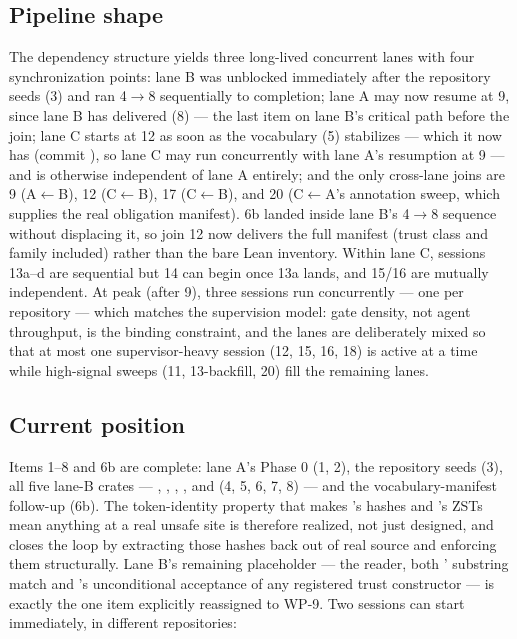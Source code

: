 \subsection{Pipeline shape}

The dependency structure yields three long-lived concurrent lanes with
four synchronization points: lane B was unblocked immediately after the
repository seeds (3) and ran 4$\to$8 sequentially to completion; lane A
may now resume at 9, since lane B has delivered  (8) ---
the last item on lane B's critical path before the join; lane C starts at 12 as soon as the vocabulary
(5) stabilizes --- which it now has (commit ), so lane C
may run concurrently with lane A's resumption at 9 --- and is otherwise
independent of lane A entirely; and
the only cross-lane joins are 9 (A$\leftarrow$B), 12 (C$\leftarrow$B),
17 (C$\leftarrow$B), and 20 (C$\leftarrow$A's annotation sweep, which
supplies the real obligation manifest). 6b landed inside lane B's
4$\to$8 sequence without displacing it, so join 12 now delivers the
full manifest (trust class and family included) rather than the bare
Lean inventory. Within lane C, sessions 13a--d
are sequential but 14 can begin once 13a lands, and 15/16 are mutually
independent. At peak (after 9), three sessions run concurrently ---
one per repository --- which matches the supervision model: gate
density, not agent throughput, is the binding constraint, and the
lanes are deliberately mixed so that at most one supervisor-heavy
session (12, 15, 16, 18) is active at a time while high-signal sweeps
(11, 13-backfill, 20) fill the remaining lanes.

\subsection{Current position}
\label{sec:decomposition-position}

Items 1--8 and 6b are complete: lane A's Phase 0 (1, 2), the repository
seeds (3), all five lane-B crates --- ,
, , , and
 (4, 5, 6, 7, 8) --- and the vocabulary-manifest
follow-up (6b). The token-identity property that makes
's hashes and 's ZSTs mean anything
at a real unsafe site is therefore realized, not just designed, and
 closes the loop by extracting those hashes back out
of real source and enforcing them structurally. Lane B's remaining
placeholder --- the  reader, both '
substring match and 's unconditional acceptance of any
registered trust constructor --- is exactly the one item explicitly
reassigned to WP-9. Two sessions can start immediately, in different
repositories:

